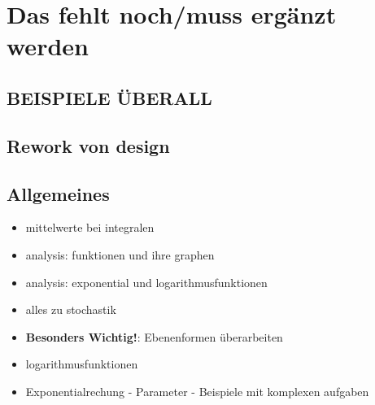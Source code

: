 \chapter{Das fehlt noch/muss ergänzt werden}
\section{BEISPIELE ÜBERALL}
\section{Rework von design}
\section{Allgemeines}
\begin{itemize}
    \item mittelwerte bei integralen
    \item analysis: funktionen und ihre graphen
    \item analysis: exponential und logarithmusfunktionen
    \item alles zu stochastik
    \item \textbf{Besonders Wichtig!}: Ebenenformen überarbeiten 
    \item logarithmusfunktionen
    \item Exponentialrechung - Parameter - Beispiele mit komplexen aufgaben
\end{itemize}

